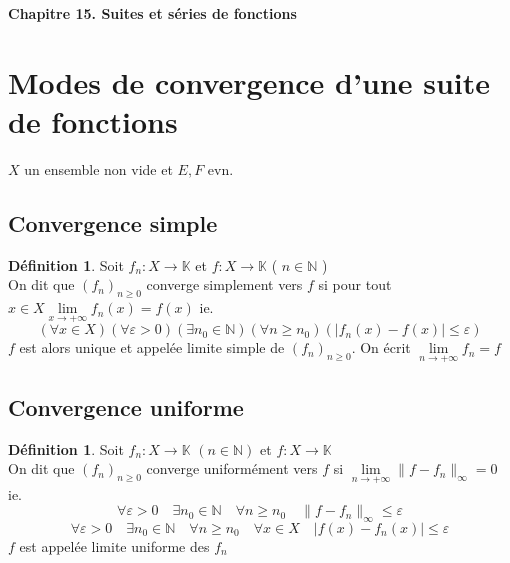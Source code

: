 \documentclass[10pt,a4paper]{article}
\theoremstyle{definition}
\newtheorem{definition}[proposition]{Définition}
\begin{document}
\renewcommand{\labelitemi}{\textbullet}

\renewcommand{\labelenumi}{(\roman{enumi})}

\begin{center}
{\Large \textbf{Chapitre 15. Suites et séries de fonctions}}
\end{center}
\section{Modes de convergence d'une suite de fonctions}
\noindent $X$ un ensemble non vide et $E, F$ evn.
\subsection{Convergence simple}
\begin{definition}
Soit $f_n: X \to \mathbb{K}$ et $f: X \to \mathbb{K}$ ( $n \in \mathbb{N}$ ) \\
On dit que $(f_n)_{n \geq 0}$ converge simplement vers $f$ si pour tout $x \in X \lim\limits_{x \to +\infty} f_n(x) = f(x)$ ie.
\[(\forall x \in X)(\forall \varepsilon > 0)(\exists n_0 \in \mathbb{N})(\forall n \geq n_0)(|f_n(x) - f(x)|\leq \varepsilon) \]
$f$ est alors unique et appelée limite simple de $(f_n)_{n \geq 0}$. On écrit $\lim\limits_{n \to +\infty}f_n = f$
\end{definition}

\subsection{Convergence uniforme}
\begin{definition}
Soit $f_n: X \to \mathbb{K}$ $(n \in \mathbb{N})$ et $f: X \to \mathbb{K}$ \\
On dit que $(f_n)_{n \geq 0}$ converge uniformément vers $f$ si $\lim\limits_{n \to +\infty} \lVert f - f_n \rVert_\infty = 0$ ie.
\[ \forall \varepsilon > 0 \quad \exists n_0 \in \mathbb{N} \quad \forall n \geq n_0 \quad \lVert f - f_n \rVert_\infty \leq \varepsilon \]
\[ \forall \varepsilon > 0 \quad \exists n_0 \in \mathbb{N} \quad \forall n \geq n_0 \quad \forall x \in X \quad |f(x) - f_n(x)| \leq \varepsilon \]
$f$ est appelée limite uniforme des $f_n$
\end{definition}

\renewcommand{\labelenumi}{\arabic{enumi}.}
\end{document}
